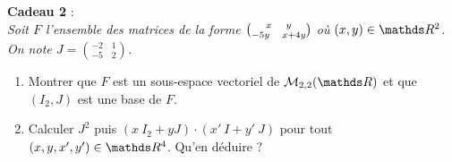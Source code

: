 \documentclass[a4paper]{article}
\begin{document}
	\centerline{}

	\bigskip
	\bigskip
	
	{\bf Cadeau 2} :\\
	\slshape
	Soit $F$\/ l'ensemble des matrices de la forme ${x\hfil y\choose -5y\quad x+4y}$\/ où $(x, y) \in \R^2$. On note $J = {-2\quad1\choose -5\quad2}$.
	\begin{enumerate}
		\item Montrer que $F$\/ est un sous-espace vectoriel de $\mathscr{M}_{2,2}(\R)$\/ et que $(I_2, J)$\/ est une base de $F$.
		\item Calculer $J^2$\/ puis $(x\:I_2 + y J)\cdot (x'\:I + y'\:J)$\/ pour tout $(x,y,x',y') \in \R^4$. Qu'en déduire ?
	\end{enumerate}

	\upshape
	\bigskip
	\bigskip
\end{document}
